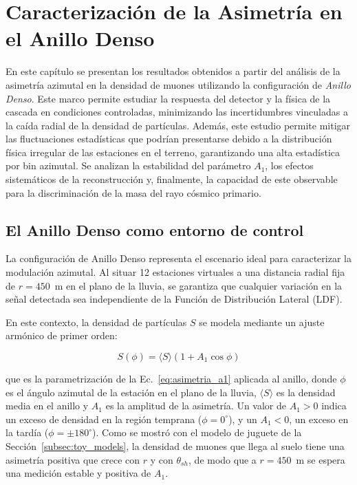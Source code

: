 
\section{Caracterización de la Asimetría en el Anillo Denso}
\label{sec:cap_anillo_denso}

En este capítulo se presentan los resultados obtenidos a partir del análisis de la asimetría azimutal en la densidad de muones utilizando la configuración de \textit{Anillo Denso}. Este marco permite estudiar la respuesta del detector y la física de la cascada en condiciones controladas, minimizando las incertidumbres vinculadas a la caída radial de la densidad de partículas. Además, este estudio permite mitigar las fluctuaciones estadísticas que podrían presentarse debido a la distribución física irregular de las estaciones en el terreno, garantizando una alta estadística por bin azimutal. Se analizan la estabilidad del parámetro $A_1$, los efectos sistemáticos de la reconstrucción y, finalmente, la capacidad de este observable para la discriminación de la masa del rayo cósmico primario.

\subsection{El Anillo Denso como entorno de control}
\label{subsec:entorno_control}

La configuración de Anillo Denso representa el escenario ideal para caracterizar la modulación azimutal. Al situar 12 estaciones virtuales a una distancia radial fija de $r = 450$~m en el plano de la lluvia, se garantiza que cualquier variación en la señal detectada sea independiente de la Función de Distribución Lateral (LDF). 

En este contexto, la densidad de partículas $S$ se modela mediante un ajuste armónico de primer orden:

\begin{equation}
	S(\phi) = \langle S \rangle (1 + A_1 \cos\phi)
	\label{eq:ajuste_armonico}
\end{equation}

que es la parametrización de la Ec.~\ref{eq:asimetria_a1} aplicada al anillo, donde $\phi$ es el ángulo azimutal de la estación en el plano de la lluvia, $\langle S \rangle$ es la densidad media en el anillo y $A_1$ es la amplitud de la asimetría. Un valor de $A_1 > 0$ indica un exceso de densidad en la región temprana ($\phi = 0^\circ$), y un $A_1 < 0$, un exceso en la tardía ($\phi = \pm 180^\circ$). Como se mostró con el modelo de juguete de la Sección~\ref{subsec:toy_models}, la densidad de muones que llega al suelo tiene una asimetría positiva que crece con $r$ y con $\theta_{sh}$, de modo que a $r = 450$~m se espera una medición estable y positiva de $A_1$.

